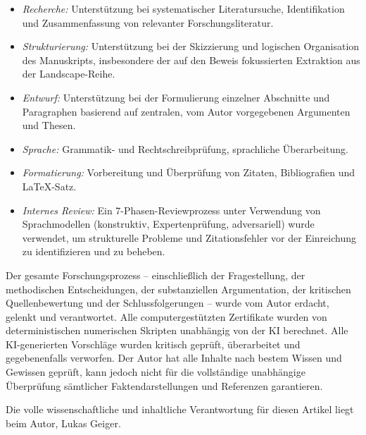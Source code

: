 \documentclass[11pt,a4paper]{article}
\theoremstyle{remark}
\theoremstyle{plain}
\begin{document}
\begin{itemize}[leftmargin=*,itemsep=1pt,topsep=2pt,parsep=0pt]
  \item \textit{Recherche:} Unterstützung bei systematischer Literatursuche, Identifikation und Zusammenfassung von relevanter Forschungsliteratur.
  \item \textit{Strukturierung:} Unterstützung bei der Skizzierung und logischen Organisation des Manuskripts, insbesondere der auf den Beweis fokussierten Extraktion aus der Landscape-Reihe.
  \item \textit{Entwurf:} Unterstützung bei der Formulierung einzelner Abschnitte und Paragraphen basierend auf zentralen, vom Autor vorgegebenen Argumenten und Thesen.
  \item \textit{Sprache:} Grammatik- und Rechtschreibprüfung, sprachliche Überarbeitung.
  \item \textit{Formatierung:} Vorbereitung und Überprüfung von Zitaten, Bibliografien und \LaTeX{}-Satz.
  \item \textit{Internes Review:} Ein 7-Phasen-Reviewprozess unter Verwendung von Sprachmodellen (konstruktiv, Expertenprüfung, adversariell) wurde verwendet, um strukturelle Probleme und Zitationsfehler vor der Einreichung zu identifizieren und zu beheben.
\end{itemize}

\noindent
Der gesamte Forschungsprozess -- einschließlich der Fragestellung, der methodischen Entscheidungen, der substanziellen Argumentation, der kritischen Quellenbewertung und der Schlussfolgerungen -- wurde vom Autor erdacht, gelenkt und verantwortet. Alle computergestützten Zertifikate wurden von deterministischen numerischen Skripten unabhängig von der KI berechnet. Alle KI-generierten Vorschläge wurden kritisch geprüft, überarbeitet und gegebenenfalls verworfen. Der Autor hat alle Inhalte nach bestem Wissen und Gewissen geprüft, kann jedoch nicht für die vollständige unabhängige Überprüfung sämtlicher Faktendarstellungen und Referenzen garantieren.

\smallskip

\noindent
Die volle wissenschaftliche und inhaltliche Verantwortung für diesen Artikel liegt beim Autor, Lukas Geiger.

\normalsize



\end{document}
